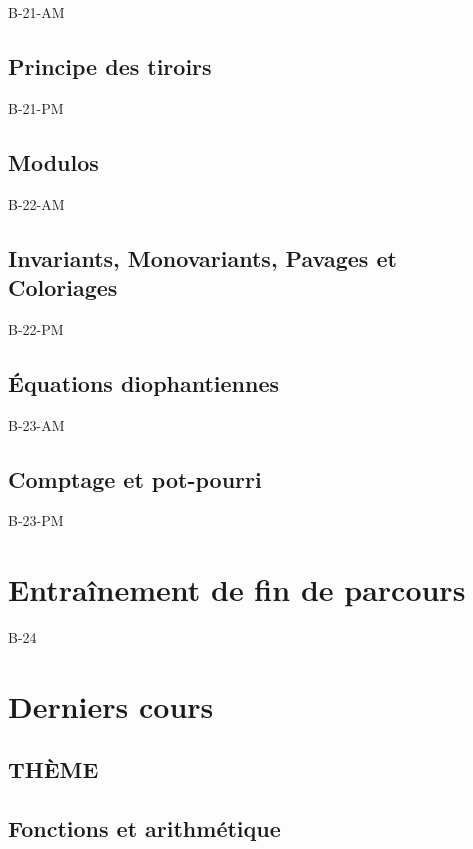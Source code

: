 \documentclass[poly,trombi]{valbonne}
\begin{document}
{B-21-AM}

\subsection{Principe des tiroirs}

{B-21-PM}

\subsection{Modulos}
{B-22-AM}

\subsection{Invariants, Monovariants, Pavages et Coloriages}

{B-22-PM}

\subsection{Équations diophantiennes}

{B-23-AM}

\subsection{Comptage et pot-pourri}

{B-23-PM}


\section{Entraînement de fin de parcours}

{B-24}


\section{Derniers cours}

\subsection{THÈME}


\subsection{Fonctions et arithmétique}
\end{document}
